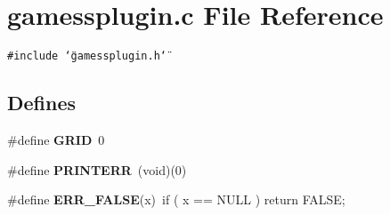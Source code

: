 \section{gamessplugin.c File Reference}
\label{gamessplugin_8c}
{\tt \#include \char`\"{}gamessplugin.h\char`\"{}}\par
\subsection*{Defines}
\begin{CompactItemize}
\item 
\#define {\bf GRID}\ 0
\item 
\#define {\bf PRINTERR}\ (void)(0)
\item 
\#define {\bf ERR\_\-FALSE}(x)\ if ( x == NULL ) return FALSE;
\end{CompactItemize}
